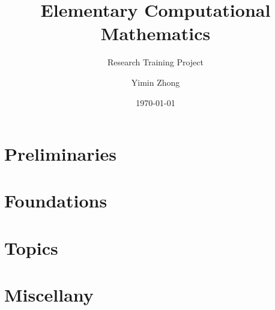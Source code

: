 \documentclass[12pt,a4paper,final]{book}
\title{Elementary Computational Mathematics}
\subtitle{Research Training Project}
\author{Yimin Zhong}
\date{\today}
\begin{document}
\maketitle
\frontmatter

\tableofcontents
\mainmatter
\part{Preliminaries}









\part{Foundations}

\part{Topics}

\part{Miscellany}

\end{document}
